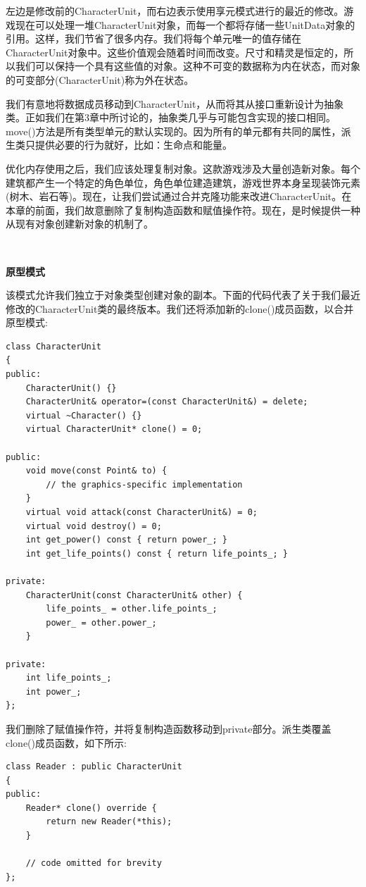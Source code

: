 左边是修改前的CharacterUnit，而右边表示使用享元模式进行的最近的修改。游戏现在可以处理一堆CharacterUnit对象，而每一个都将存储一些UnitData对象的引用。这样，我们节省了很多内存。我们将每个单元唯一的值存储在CharacterUnit对象中。这些价值观会随着时间而改变。尺寸和精灵是恒定的，所以我们可以保持一个具有这些值的对象。这种不可变的数据称为内在状态，而对象的可变部分(CharacterUnit)称为外在状态。 \par
我们有意地将数据成员移动到CharacterUnit，从而将其从接口重新设计为抽象类。正如我们在第3章中所讨论的，抽象类几乎与可能包含实现的接口相同。move()方法是所有类型单元的默认实现的。因为所有的单元都有共同的属性，派生类只提供必要的行为就好，比如：生命点和能量。 \par
优化内存使用之后，我们应该处理复制对象。这款游戏涉及大量创造新对象。每个建筑都产生一个特定的角色单位，角色单位建造建筑，游戏世界本身呈现装饰元素(树木、岩石等)。现在，让我们尝试通过合并克隆功能来改进CharacterUnit。在本章的前面，我们故意删除了复制构造函数和赋值操作符。现在，是时候提供一种从现有对象创建新对象的机制了。 \par

\noindent\textbf{}\ \par
\textbf{原型模式} \ \par
该模式允许我们独立于对象类型创建对象的副本。下面的代码代表了关于我们最近修改的CharacterUnit类的最终版本。我们还将添加新的clone()成员函数，以合并原型模式: \par

\begin{lstlisting}[caption={}]
class CharacterUnit
{
public:
	CharacterUnit() {}
	CharacterUnit& operator=(const CharacterUnit&) = delete;
	virtual ~Character() {}
	virtual CharacterUnit* clone() = 0;
	
public:
	void move(const Point& to) {
		// the graphics-specific implementation
	}
	virtual void attack(const CharacterUnit&) = 0;
	virtual void destroy() = 0;
	int get_power() const { return power_; }
	int get_life_points() const { return life_points_; }
	
private:
	CharacterUnit(const CharacterUnit& other) {
		life_points_ = other.life_points_;
		power_ = other.power_;
	}

private:
	int life_points_;
	int power_;
};
\end{lstlisting}

我们删除了赋值操作符，并将复制构造函数移动到private部分。派生类覆盖clone()成员函数，如下所示: \par

\begin{lstlisting}[caption={}]
class Reader : public CharacterUnit
{
public:
	Reader* clone() override {
		return new Reader(*this);
	}

	// code omitted for brevity
};
\end{lstlisting}

